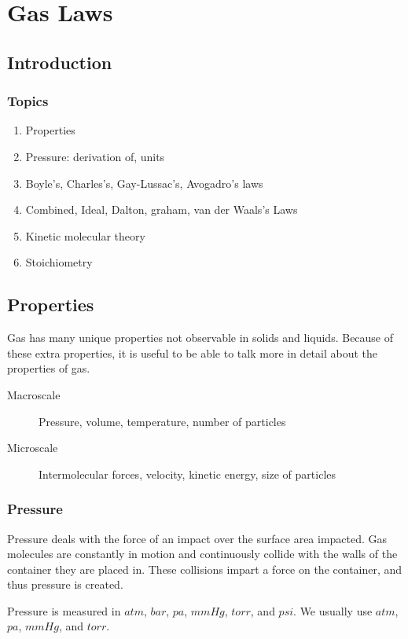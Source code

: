 \chapter{Gas Laws}
\section{Introduction}
\subsection{Topics}
\begin{enumerate}
  \item Properties
  \item Pressure: derivation of, units
  \item Boyle's, Charles's, Gay-Lussac's, Avogadro's laws
  \item Combined, Ideal, Dalton, graham, van der Waals's Laws
  \item Kinetic molecular theory
  \item Stoichiometry
\end{enumerate}

\section{Properties}
Gas has many unique properties not observable in solids and liquids. Because of
these extra properties, it is useful to be able to talk more in detail about the
properties of gas.

\begin{description}
  \item[Macroscale] Pressure, volume, temperature, number of particles
  \item[Microscale] Intermolecular forces, velocity, kinetic energy, size of
    particles
\end{description}

\subsection{Pressure}
Pressure deals with the force of an impact over the surface area impacted. Gas
molecules are constantly in motion and continuously collide with the walls of
the container they are placed in. These collisions impart a force on the
container, and thus pressure is created.

Pressure is measured in $atm$, $bar$, $pa$, $mmHg$, $torr$, and $psi$. We
usually use $atm$, $pa$, $mmHg$, and $torr$.


